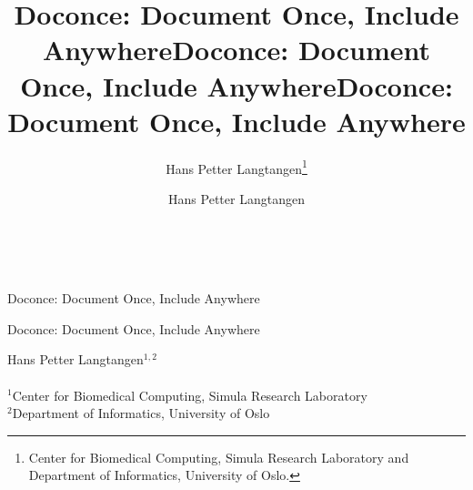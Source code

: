 \documentclass[%
oneside,                 %
final,                   %
10pt]{article}
\begin{document}






\title{Doconce: Document Once, Include Anywhere}


\thispagestyle{empty}
\hbox{\ \ }
\vfill
\begin{center}
{\huge{\bfseries{
\begin{spacing}{1.25}
Doconce: Document Once, Include Anywhere
\end{spacing}
}}}

\title*{Doconce: Document Once, Include Anywhere}

\title{Doconce: Document Once, Include Anywhere}
\begin{center}
{\LARGE\bf
\begin{spacing}{1.25}
Doconce: Document Once, Include Anywhere
\end{spacing}
}
\end{center}

\author{Hans Petter Langtangen\footnote{Center for Biomedical Computing, Simula Research Laboratory and Department of Informatics, University of Oslo.}}

\vspace{1.3cm}

    {\Large\textsf{Hans Petter Langtangen${}^{1, 2}$}}\\ [3mm]
    
\ \\ [2mm]

{\large\textsf{${}^1$Center for Biomedical Computing, Simula Research Laboratory} \\ [1.5mm]}
{\large\textsf{${}^2$Department of Informatics, University of Oslo} \\ [1.5mm]}

\author{Hans Petter Langtangen}


\end{center}
\end{document}
